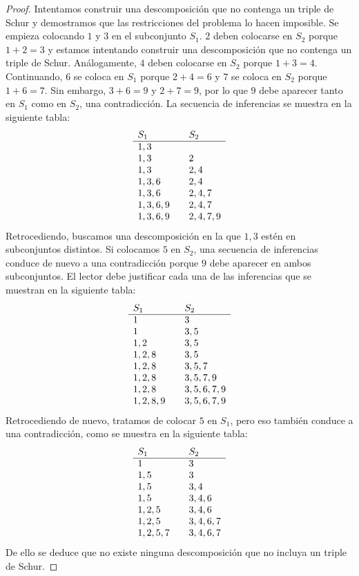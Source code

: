 \begin{proof}
Intentamos construir una descomposición que no contenga un triple de Schur y demostramos que las restricciones del problema lo hacen imposible. Se empieza colocando $1$ y $3$ en el subconjunto $S_1$. $2$ deben colocarse en $S_2$ porque $1+2=3$ y estamos intentando construir una descomposición que no contenga un triple de Schur. Análogamente, $4$ deben colocarse en $S_2$ porque $1+3=4$. Continuando, $6$ se coloca en $S_1$ porque $2+4=6$ y $7$ se coloca en $S_2$ porque $1+6=7$. Sin embargo, $3+6=9$ y $2+7=9$, por lo que $9$ debe aparecer tanto en $S_1$ como en $S_2$, una contradicción. La secuencia de inferencias se muestra en la siguiente tabla:
\[
\begin{array}{l@{\hspace{2em}}l}
S_1&S_2\\\hline
1,3 & \\
1,3 & 2\\
1,3 & 2,4\\
1,3,6 & 2,4\\
1,3,6 & 2,4,7\\
1,3,6,9 & 2,4,7\\
1,3,6,9 & 2,4,7,9
\end{array}
\]
Retrocediendo, buscamos una descomposición en la que $1,3$ estén en subconjuntos distintos. Si colocamos $5$ en $S_2$, una secuencia de inferencias conduce de nuevo a una contradicción porque $9$ debe aparecer en ambos subconjuntos. El lector debe justificar cada una de las inferencias que se muestran en la siguiente tabla:
\[
\begin{array}{l@{\hspace{2em}}l}
S_1&S_2\\\hline
1&3\\
1 & 3,5\\
1,2&3,5\\
1,2,8&3,5\\
1,2,8&3,5,7\\
1,2,8&3,5,7,9\\
1,2,8&3,5,6,7,9\\
1,2,8,9&3,5,6,7,9
\end{array}
\]
Retrocediendo de nuevo, tratamos de colocar $5$ en $S_1$, pero eso también conduce a una contradicción, como se muestra en la siguiente tabla:
\[
\begin{array}{l@{\hspace{2em}}l}
S_1&S_2\\\hline
1&3\\
1,5& 3\\
1,5&3,4\\
1,5&3,4,6\\
1,2,5&3,4,6\\
1,2,5&3,4,6,7\\
1,2,5,7&3,4,6,7
\end{array}
\]
De ello se deduce que no existe ninguna descomposición que no incluya un triple de Schur.
\end{proof}
